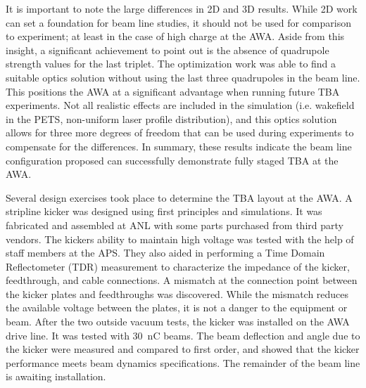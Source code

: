 It is important to note the large differences in 2D and 3D results. While 2D work can set a foundation
for beam line studies, it should not be used for comparison to experiment; 
at least in the case of high charge at the AWA. Aside from this insight,
a significant achievement to point out is the absence of quadrupole strength values for the last triplet.
The optimization work was able to find a suitable optics solution without using the last three quadrupoles 
in the beam line. This positions the AWA at a significant advantage when running future TBA experiments.
Not all realistic effects are included in the simulation (i.e. wakefield in the PETS, non-uniform laser profile distribution), 
and this optics solution allows for three more degrees of freedom that can be used during experiments 
to compensate for the differences. In summary, these results indicate the beam line configuration proposed 
can successfully demonstrate fully staged TBA at the AWA.


Several design exercises took place to determine the TBA layout at the AWA. 
A stripline kicker was designed using first principles and simulations. 
It was fabricated and assembled at ANL with some parts purchased from third party vendors.
The kickers ability to maintain high voltage was tested with the help of staff members at the APS.
They also aided  in performing a Time Domain Reflectometer (TDR) measurement to characterize 
the impedance of the kicker, feedthrough, and cable connections. 
A mismatch at the connection point between the kicker plates and feedthroughs was discovered.
While the mismatch reduces the available voltage between the plates, it is not a danger to 
the equipment or beam. After the two outside vacuum tests, the kicker was installed on 
the AWA drive line. It was tested with \SI{30}{nC} beams. 
The beam deflection and angle due to the kicker were measured and 
compared to first order, and showed that the kicker performance meets beam dynamics specifications. 
The remainder of the beam line is awaiting installation. 

